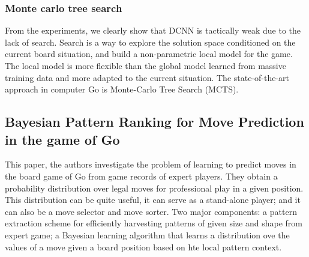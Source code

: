 \subsubsection{Monte carlo tree search}
From the experiments, we clearly show that DCNN is tactically weak due to the lack of search.
Search is a way to explore the solution space conditioned on the current board situation, and build
a non-parametric local model for the game. The local model is more flexible than the global model
learned from massive training data and more adapted to the current situation. The state-of-the-art
approach in computer Go is Monte-Carlo Tree Search (MCTS).
\subsection{Bayesian Pattern Ranking for Move Prediction in the game of Go~\cite{stern2006bayesian}}
This paper, the authors investigate the problem of learning to predict moves in the board game of Go from game records of expert players. They obtain a probability distribution over legal moves for professional play in a given position.
This distribution can be quite useful, it can serve as a stand-alone player; and it can also be a move selector and move sorter. Two major components: a pattern extraction scheme for efficiently harvesting patterns of given size and shape from expert game; a Bayesian learning algorithm that learns a distribution ove the values of a move given a board position based on hte local pattern context.

